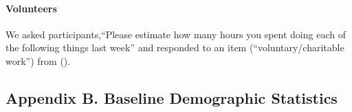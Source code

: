 \documentclass[
  singlecolumn]{article}
\let\oldparagraph\paragraph
\renewcommand{\paragraph}[1]{\oldparagraph{#1}\mbox{}}
\begin{document}
\paragraph{Volunteers}\label{volunteers}

We asked participants,``Please estimate how many hours you spent doing
each of the following things last week'' and responded to an item
(``voluntary/charitable work'') from ().

\subsection{Appendix B. Baseline Demographic
Statistics}\label{appendix-demographics}

\begin{table}

\caption{\label{tbl-B}}

\centering{

\captionsetup{labelsep=none}

}

\end{table}%
\end{document}
